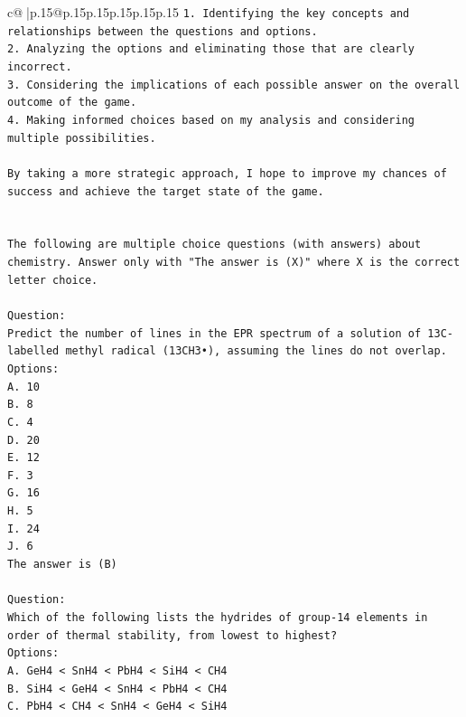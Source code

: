 \documentclass{article}
\begin{document}
{\begin{supertabular}{c@{$\;$}|p{.15\linewidth}@{}p{.15\linewidth}p{.15\linewidth}p{.15\linewidth}p{.15\linewidth}p{.15\linewidth}}
{{{\texttt{1. Identifying the key concepts and relationships between the questions and options.} \\
\texttt{2. Analyzing the options and eliminating those that are clearly incorrect.} \\
\texttt{3. Considering the implications of each possible answer on the overall outcome of the game.} \\
\texttt{4. Making informed choices based on my analysis and considering multiple possibilities.} \\
\\ 
\texttt{By taking a more strategic approach, I hope to improve my chances of success and achieve the target state of the game.} \\
\\ 
\\ 
\texttt{The following are multiple choice questions (with answers) about chemistry. Answer only with "The answer is (X)" where X is the correct letter choice.} \\
\\ 
\texttt{Question:} \\
\texttt{Predict the number of lines in the EPR spectrum of a solution of 13C{-}labelled methyl radical (13CH3•), assuming the lines do not overlap.} \\
\texttt{Options:} \\
\texttt{A. 10} \\
\texttt{B. 8} \\
\texttt{C. 4} \\
\texttt{D. 20} \\
\texttt{E. 12} \\
\texttt{F. 3} \\
\texttt{G. 16} \\
\texttt{H. 5} \\
\texttt{I. 24} \\
\texttt{J. 6} \\
\texttt{The answer is (B)} \\
\\ 
\texttt{Question:} \\
\texttt{Which of the following lists the hydrides of group{-}14 elements in order of thermal stability, from lowest to highest?} \\
\texttt{Options:} \\
\texttt{A. GeH4 < SnH4 < PbH4 < SiH4 < CH4} \\
\texttt{B. SiH4 < GeH4 < SnH4 < PbH4 < CH4} \\
\texttt{C. PbH4 < CH4 < SnH4 < GeH4 < SiH4} \\
}}}
\end{supertabular}}
\end{document}

